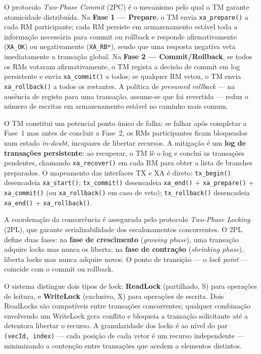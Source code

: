 O protocolo \textit{Two-Phase Commit} (2PC) é o mecanismo pelo qual o TM garante atomicidade
distribuída. Na \textbf{Fase 1 — Prepare}, o TM envia \texttt{xa\_prepare()} a cada RM participante;
cada RM persiste em armazenamento estável toda a informação necessária para commit ou rollback e
responde afirmativamente (\texttt{XA\_OK}) ou negativamente (\texttt{XA\_RB*}), sendo que uma
resposta negativa veta imediatamente a transação global. Na \textbf{Fase 2 — Commit/Rollback},
se todos os RMs votaram afirmativamente, o TM regista a decisão de commit em log persistente e
envia \texttt{xa\_commit()} a todos; se qualquer RM vetou, o TM envia \texttt{xa\_rollback()} a
todos os restantes. A política de \textit{presumed rollback} — na ausência de registo para uma
transação, assume-se que foi revertida — reduz o número de escritas em armazenamento estável no
caminho mais comum.

O TM constitui um potencial ponto único de falha: se falhar após completar a Fase~1 mas antes de
concluir a Fase~2, os RMs participantes ficam bloqueados num estado \textit{in-doubt}, incapazes
de libertar recursos. A mitigação é um \textbf{log de transações persistente}: ao recuperar, o TM
lê o log e conclui as transações pendentes, chamando \texttt{xa\_recover()} em cada RM para obter
a lista de branches preparados. O mapeamento das interfaces TX e XA é direto:
\texttt{tx\_begin()} desencadeia \texttt{xa\_start()}; \texttt{tx\_commit()} desencadeia
\texttt{xa\_end()} + \texttt{xa\_prepare()} + \texttt{xa\_commit()} (ou
\texttt{xa\_rollback()} em caso de veto); \texttt{tx\_rollback()} desencadeia
\texttt{xa\_end()} + \texttt{xa\_rollback()}.

A coordenação da concorrência é assegurada pelo protocolo \textit{Two-Phase Locking} (2PL), que
garante serializabilidade dos escalonamentos concorrentes. O 2PL define duas fases: na
\textbf{fase de crescimento} (\textit{growing phase}), uma transação adquire locks mas nunca os
liberta; na \textbf{fase de contração} (\textit{shrinking phase}), liberta locks mas nunca adquire
novos. O ponto de transição — o \textit{lock point} — coincide com o commit ou rollback.

O sistema distingue dois tipos de lock: \textbf{ReadLock} (partilhado, S) para operações de
leitura, e \textbf{WriteLock} (exclusivo, X) para operações de escrita. Dois ReadLocks são
compatíveis entre transações concorrentes; qualquer combinação envolvendo um WriteLock gera
conflito e bloqueia a transação solicitante até a detentora libertar o recurso. A granularidade
dos locks é ao nível do par \texttt{(vecId,~index)} — cada posição de cada vetor é um recurso
independente — minimizando a contenção entre transações que acedem a elementos distintos.

